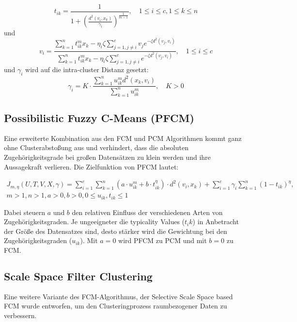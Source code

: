 \documentclass[11pt,ceqn]{book}
\begin{document}
$$t_{ik} = \frac{1}{1+\left(\frac{d^2(v_i,x_k)}{\gamma_i}\right)^{\frac{1}{m-1}}},\quad 1\leqslant i \leqslant c, 1\leqslant k\leqslant n$$
und
$$v_i = \frac{\sum\limits_{k=1}^n t_{ik}^m x_k - \eta_i \zeta \sum\limits_{j=1,j\neq i}^c v_j e^{-\zeta d^2(v_j,v_i)}}{\sum\limits_{k=1}^n t_{ik}^m x_k - \eta_i \zeta \sum\limits_{j=1,j\neq i}^c e^{-\zeta d^2(v_j,v_i)}},\quad 1\leqslant i \leqslant c$$
und $\gamma_i$ wird auf die intra-cluster Distanz gesetzt:
$$\gamma_i = K\cdot \frac{\sum\limits_{k=1}^n u_{ik}^m d^2 (x_k, v_i)}{\sum\limits_{k=1}^n u_{ik}^m},\quad K>0$$

\subsection{Possibilistic Fuzzy C-Means (PFCM)}
Eine erweiterte Kombination aus den FCM und PCM Algorithmen kommt ganz ohne Clusterabstoßung aus und verhindert, dass die absoluten Zugehörigkeitsgrade bei großen Datensätzen zu klein werden und ihre Aussagekraft verlieren. Die Zielfunktion von PFCM\cite{pfcmpaper} lautet:

\begin{equation}
\begin{split}
J_{m,\eta}(U,T,V,X,\gamma) = \sum_{i=1}^{c} \sum_{k=1}^{n} \left(a\cdot u_{ik}^m + b\cdot t_{ik}^{\eta}\right)\cdot d^2(v_i,x_k) + \sum_{i=1}^c  \gamma_i \sum_{k=1}^n (1-t_{ik})^{\eta}, \\ m>1, n>1,a>0, b>0, 0\leqslant u_{ik}, t_{ik} \leqslant 1
\end{split}
\end{equation}

Dabei steuern $a$ und $b$ den relativen Einfluss der verschiedenen Arten von Zugehörigkeitsgraden. Je ungeeigneter die typicality Values ($t_ik$) in Anbetracht der Größe des Datensatzes sind, desto stärker wird die Gewichtung bei den Zugehörigkeitsgraden ($u_{ik}$). Mit $a=0$ wird PFCM zu PCM und mit $b=0$ zu FCM.

\subsection{Scale Space Filter Clustering}
Eine weitere Variante des FCM-Algorithmus, der Selective Scale Space based FCM wurde entworfen, um den Clusteringprozess raumbezogener Daten zu verbessern. 
\end{document}
